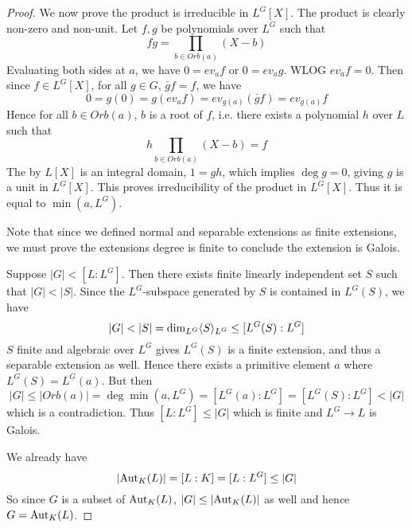\documentclass[../book.tex]{subfiles}
\begin{document}
\begin{proof}
        We now prove the product is irreducible in $L^G[X]$.
        The product is clearly non-zero and non-unit. 
        Let $f, g$ be polynomials over $L^G$ such that \[
            fg = \prod_{b \in Orb(a)} (X - b)
        \]
        Evaluating both sides at $a$, we have $0 = ev_a f$ or $0 = ev_a g$. 
        WLOG $ev_a f = 0$. 
        Then since $f \in L^G[X]$, for all $g \in G$, $\bar{g}f = f$, 
        we have \[
            0 = g(0) = g(ev_a f) = ev_{g(a)}(\bar{g} f) = ev_{g(a)} f
        \]
        Hence for all $b \in Orb(a)$, $b$ is a root of $f$, i.e.
        there exists a polynomial $h$ over $L$ such that \[
            h \prod_{b \in Orb(a)} (X - b) = f
        \]
        The by $L[X]$ is an integral domain, $1 = gh$,
        which implies $\deg g = 0$, giving $g$ is a unit in $L^G[X]$. 
        This proves irreducibility of the product in $L^G[X]$. 
        Thus it is equal to $\min(a,L^G)$. 
    
        Note that since we defined normal and separable extensions as 
        finite extensions,
        we must prove the extensions degree is finite 
        to conclude the extension is Galois.
    
        Suppose $|G| < [L : L^G]$. 
        Then there exists finite linearly independent set $S$ such that $|G| < |S|$. 
        Since the $L^G$-subspace generated by $S$ is contained in $L^G(S)$, 
        we have \[ 
            |G| < |S| = \dim_{L^G} \langle S\rangle_{L^G} \leq [L^G(S) : L^G] 
        \]
        $S$ finite and algebraic over $L^G$ gives $L^G(S)$ is a finite extension,
        and thus a separable extension as well. 
        Hence there exists a primitive element $a$ where $L^G(S) = L^G(a)$. 
        But then \[
            |G| \leq |Orb(a)| = \deg\min(a,L^G) = [L^G(a) : L^G] 
            = [L^G(S) : L^G] < |G|
        \]
        which is a contradiction. 
        Thus $[L : L^G] \leq |G|$ which is finite
        and $L^G \to L$ is Galois. 
    
        We already have \[
            |\text{Aut}_{K}(L)| = [L : K] = [L : L^G] \leq |G|
        \]
        So since $G$ is a subset of $\text{Aut}_{K}(L)$, 
        $|G| \leq |\text{Aut}_{K}(L)|$ as well and hence $G = \text{Aut}_{K}(L)$.  
    
\end{proof}
\end{document}
